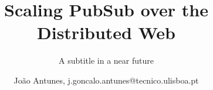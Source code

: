 \documentclass{./llncs2e/llncs}
\begin{document}
\title{Scaling PubSub over the Distributed Web}

\subtitle{A subtitle in a near future}
\author{João Antunes, j.goncalo.antunes@tecnico.ulisboa.pt}

\maketitle

\setcounter{tocdepth}{2}
\makeatletter
\renewcommand*\l@author[2]{}
\renewcommand*\l@title[2]{}
\makeatletter

\cleardoublepage



\cleardoublepage
\tableofcontents
\cleardoublepage
\pagestyle{plain}

\cleardoublepage

\cleardoublepage

\cleardoublepage

\cleardoublepage

\cleardoublepage

\cleardoublepage
\newpage
\appendix

\cleardoublepage


%
%


\end{document}
